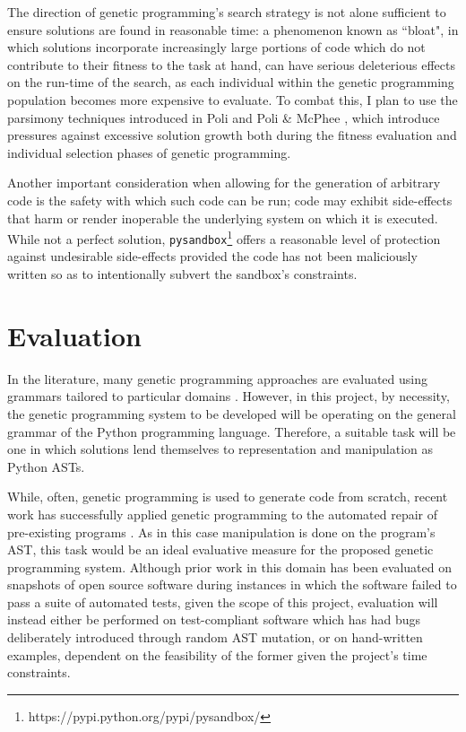 \documentclass[a4paper,11pt]{proposal}
\begin{document}
The direction of genetic programming's search strategy is not alone sufficient to ensure solutions are found in reasonable time: a phenomenon known as ``bloat", in which solutions incorporate increasingly large portions of code which do not contribute to their fitness to the task at hand, can have serious deleterious effects on the run-time of the search, as each individual within the genetic programming population becomes more expensive to evaluate. To combat this, I plan to use the parsimony techniques introduced in Poli \cite{poli2003} and Poli \& McPhee \cite{poli2008}, which introduce pressures against excessive solution growth both during the fitness evaluation and individual selection phases of genetic programming.

Another important consideration when allowing for the generation of arbitrary code is the safety with which such code can be run; code may exhibit side-effects that harm or render inoperable the underlying system on which it is executed. While not a perfect solution, \texttt{pysandbox}\footnote{https://pypi.python.org/pypi/pysandbox/} offers a reasonable level of protection against undesirable side-effects provided the code has not been maliciously written so as to intentionally subvert the sandbox's constraints. 


\section{Evaluation}

In the literature, many genetic programming approaches are evaluated using grammars tailored to particular domains \cite{mcdermott2012}. However, in this project, by necessity, the genetic programming system to be developed will be operating on the general grammar of the Python programming language. Therefore, a suitable task will be one in which solutions lend themselves to representation and manipulation as Python ASTs.

While, often, genetic programming is used to generate code from scratch, recent work has successfully applied genetic programming to the automated repair of pre-existing programs \cite{weimer2009}. As in this case manipulation is done on the program's AST, this task would be an ideal evaluative measure for the proposed genetic programming system. Although prior work in this domain has been evaluated on snapshots of open source software during instances in which the software failed to pass a suite of automated tests, given the scope of this project, evaluation will instead either be performed on test-compliant software which has had bugs deliberately introduced through random AST mutation, or on hand-written examples, dependent on the feasibility of the former given the project's time constraints.
\end{document}
